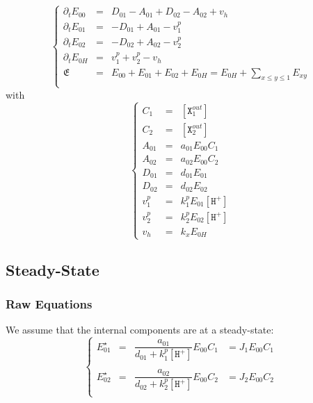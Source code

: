 \documentclass[aps,onecolumn,12pt]{revtex4}
\newcommand{\mychem}[1]{\mathtt{#1}}
\newcommand{\myconc}[1]{\left[#1\right]}
\newcommand{\spx}{\mychem{X}}
\newcommand{\spproton}{\mychem{H^+}}
\newcommand{\proton}{\myconc{\spproton}}
\begin{document}
\begin{equation}
\left\lbrace
\begin{array}{rcl}
\partial_t E_{00} & = & D_{01}-A_{01} + D_{02}-A_{02} + v_h\\
\partial_t E_{01} & = & -D_{01}+A_{01} -v^p_1 \\
\partial_t E_{02} & = & -D_{02}+A_{02} -v^p_2\\
\partial_t E_{0H} & = & v^p_1 + v^p_2 - v_h\\
\mathfrak{E}       & = & E_{00}+E_{01}+E_{02} + E_{0H} = E_{0H} + {\displaystyle \sum_{x\leq y\leq 1} E_{xy}}\\
\end{array}
\right.
\end{equation}
with
\begin{equation}
\left\lbrace
\begin{array}{rcl}
C_1    & = & \myconc{\spx_1^{out}}\\
C_2    & = & \myconc{\spx_2^{out}}\\
A_{01} &= &a_{01} E_{00} C_1\\
A_{02} &= &a_{02} E_{00} C_2\\
D_{01} &= &d_{01} E_{01}\\
D_{02} &= &d_{02} E_{02}\\
v^p_1  &=& k^p_1 E_{01} \proton\\
v^p_2  &=& k^p_2 E_{02} \proton\\
v_h    &=& k_x  E_{0H}
\end{array}
\right.
\end{equation}

\subsection{Steady-State}
\subsubsection{Raw Equations}
We assume that the internal components are at a steady-state:
\begin{equation}
\left\lbrace
\begin{array}{rcll}
	E_{01}^\star & = & \dfrac{a_{01}}{d_{01}+k^p_1 \proton } E_{00} C_1 & = J_1 E_{00} C_1\\
	\\
	E_{02}^\star & = & \dfrac{a_{02}}{d_{02}+k^p_2 \proton } E_{00} C_2 & = J_2 E_{00} C_2\\
\end{array}
\right.
\end{equation}
\end{document}
